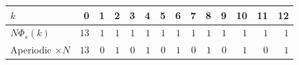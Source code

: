 \begin{tabular}{l*{13}{r}}
\toprule
$k$ & 0 & 1 & 2 & 3 & 4 & 5 & 6 & 7 & 8 & 9 & 10 & 11 & 12 \\
\midrule
$N\Phi_s(k)$ & $13$ & $1$ & $1$ & $1$ & $1$ & $1$ & $1$ & $1$ & $1$ & $1$ & $1$ & $1$ & $1$ \\
Aperiodic $\times N$ & $13$ & $0$ & $1$ & $0$ & $1$ & $0$ & $1$ & $0$ & $1$ & $0$ & $1$ & $0$ & $1$ \\
\bottomrule
\end{tabular}

